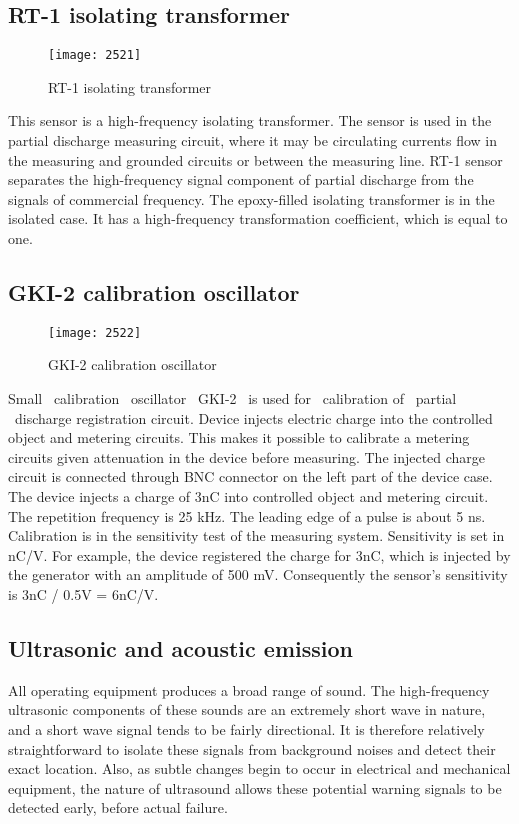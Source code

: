 \subsection{RT-1 isolating transformer}
\begin{figure}[h!]
\centering
\texttt{[image: 2521]}
\caption{RT-1 isolating transformer}
\label{fig:RT-1 isolating transformerr}
\end{figure}

This sensor is a high-frequency isolating transformer. The sensor is used in the partial discharge measuring circuit, where it may be circulating currents flow in the measuring and grounded circuits or between the measuring line. RT-1 sensor separates the high-frequency signal component of partial discharge from the signals of commercial frequency. The epoxy-filled isolating transformer is in the isolated case. It has a high-frequency transformation coefficient, which is equal to one.

\subsection{GKI-2 calibration oscillator}
\begin{figure}[h!]
\centering
\texttt{[image: 2522]}
\caption{GKI-2 calibration oscillator}
\label{fig:GKI-2 calibration oscillator}
\end{figure}

Small ~calibration ~oscillator ~GKI-2 ~is used for ~calibration of ~partial ~discharge registration circuit. Device injects electric charge into the controlled object and metering circuits. This makes it possible to calibrate a metering circuits given attenuation in the device before measuring. The injected charge circuit is connected through BNC connector on the left part of the device case.\\

The device injects a charge of 3nC into controlled object and metering circuit. The repetition frequency is 25 kHz. The leading edge of a pulse is about 5 ns. Calibration is in the sensitivity test of the measuring system. Sensitivity is set in nC/V. For example, the device registered the charge for 3nC, which is injected by the generator with an amplitude of 500 mV. Consequently the sensor's sensitivity is 3nC / 0.5V = 6nC/V.

\subsection{Ultrasonic and acoustic emission}
All operating equipment produces a broad range of sound. The high-frequency ultrasonic components of these sounds are an extremely short wave in nature, and a short wave signal tends to be fairly directional. It is therefore relatively straightforward to isolate these signals from background noises and detect their exact location. Also, as subtle changes begin to occur in electrical and mechanical equipment, the nature of ultrasound allows these potential warning signals to be detected early, before actual failure\setlength{\parskip}{1em}.

